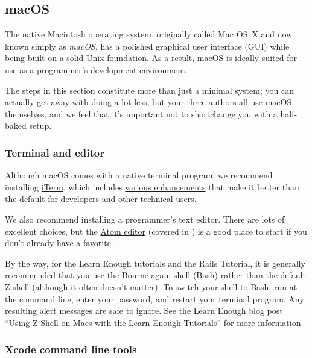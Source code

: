 \subsection{macOS} %
\label{sec:macos}

The native Macintosh operating system, originally called Mac OS~X and now known simply as \emph{macOS}, has a polished graphical user interface (GUI) while being built on a solid Unix foundation. As a result, macOS is ideally suited for use as a programmer's development environment.

The steps in this section constitute more than just a minimal system; you can actually get away with doing a lot less, but your three authors all use macOS themselves, and we feel that it's important not to shortchange you with a half-baked setup.

\subsubsection{Terminal and editor} %
\label{sec:terminal_and_editor}

Although macOS comes with a native terminal program, we recommend installing \href{https://www.iterm2.com/downloads.html}{iTerm}, which includes \href{https://www.iterm2.com/features.html}{various enhancements} that make it better than the default for developers and other technical users.

We also recommend installing a programmer's text editor. There are lots of excellent choices, but the \href{https://atom.io/}{Atom editor} (covered in ) is a good place to start if you don't already have a favorite.

By the way, for the Learn Enough tutorials and the Rails Tutorial, it is generally recommended that you use the Bourne-again shell (Bash) rather than the default Z shell (although it often doesn't matter). To switch your shell to Bash, run  at the command line, enter your password, and restart your terminal program. Any resulting alert messages are safe to ignore. See the Learn Enough blog post ``\href{https://news.learnenough.com/macos-bash-zshell}{Using Z Shell on Macs with the Learn Enough Tutorials}'' for more information.



\subsubsection{Xcode command line tools}
\label{sec:shiny_xcode}

